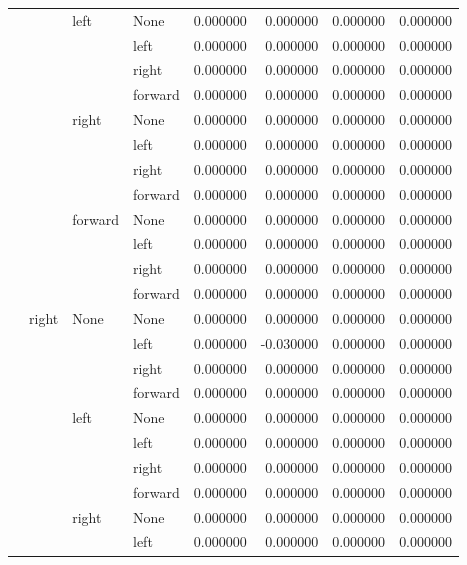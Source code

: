 \documentclass{article}
\begin{document}
\begin{longtable}{llllrrrr}
      &      & left & None &  0.000000 &  0.000000 &  0.000000 &  0.000000 \\
      &      &      & left &  0.000000 &  0.000000 &  0.000000 &  0.000000 \\
      &      &      & right &  0.000000 &  0.000000 &  0.000000 &  0.000000 \\
      &      &      & forward &  0.000000 &  0.000000 &  0.000000 &  0.000000 \\
      &      & right & None &  0.000000 &  0.000000 &  0.000000 &  0.000000 \\
      &      &      & left &  0.000000 &  0.000000 &  0.000000 &  0.000000 \\
      &      &      & right &  0.000000 &  0.000000 &  0.000000 &  0.000000 \\
      &      &      & forward &  0.000000 &  0.000000 &  0.000000 &  0.000000 \\
      &      & forward & None &  0.000000 &  0.000000 &  0.000000 &  0.000000 \\
      &      &      & left &  0.000000 &  0.000000 &  0.000000 &  0.000000 \\
      &      &      & right &  0.000000 &  0.000000 &  0.000000 &  0.000000 \\
      &      &      & forward &  0.000000 &  0.000000 &  0.000000 &  0.000000 \\
      & right & None & None &  0.000000 &  0.000000 &  0.000000 &  0.000000 \\
      &      &      & left &  0.000000 & -0.030000 &  0.000000 &  0.000000 \\
      &      &      & right &  0.000000 &  0.000000 &  0.000000 &  0.000000 \\
      &      &      & forward &  0.000000 &  0.000000 &  0.000000 &  0.000000 \\
      &      & left & None &  0.000000 &  0.000000 &  0.000000 &  0.000000 \\
      &      &      & left &  0.000000 &  0.000000 &  0.000000 &  0.000000 \\
      &      &      & right &  0.000000 &  0.000000 &  0.000000 &  0.000000 \\
      &      &      & forward &  0.000000 &  0.000000 &  0.000000 &  0.000000 \\
      &      & right & None &  0.000000 &  0.000000 &  0.000000 &  0.000000 \\
      &      &      & left &  0.000000 &  0.000000 &  0.000000 &  0.000000 \\

\end{longtable}
\end{document}
